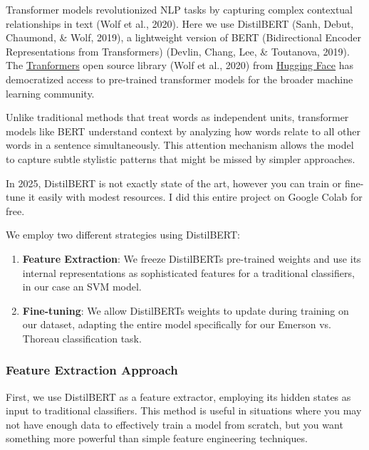 \documentclass[
]{article}
\begin{document}
Transformer models revolutionized NLP tasks by capturing complex
contextual relationships in text (Wolf et al., 2020). Here we use
DistilBERT (Sanh, Debut, Chaumond, \& Wolf, 2019), a lightweight version
of BERT (Bidirectional Encoder Representations from Transformers)
(Devlin, Chang, Lee, \& Toutanova, 2019). The
\href{https://github.com/huggingface/transformers}{Tranformers} open
source library (Wolf et al., 2020) from
\href{https://huggingface.co/}{Hugging Face} has democratized access to
pre-trained transformer models for the broader machine learning
community.

Unlike traditional methods that treat words as independent units,
transformer models like BERT understand context by analyzing how words
relate to all other words in a sentence simultaneously. This
\textquotesingle attention mechanism\textquotesingle{} allows the model
to capture subtle stylistic patterns that might be missed by simpler
approaches.

In 2025, DistilBERT is not exactly state of the art, however you can
train or fine-tune it easily with modest resources. I did this entire
project on Google Colab for free.

We employ two different strategies using DistilBERT:

\begin{enumerate}
\def\labelenumi{\arabic{enumi}.}
\item
  \textbf{Feature Extraction}: We freeze DistilBERT\textquotesingle s
  pre-trained weights and use its internal representations as
  sophisticated features for a traditional classifiers, in our case an
  SVM model.
\item
  \textbf{Fine-tuning}: We allow DistilBERT\textquotesingle s weights to
  update during training on our dataset, adapting the entire model
  specifically for our Emerson vs. Thoreau classification task.
\end{enumerate}

\subsubsection{Feature Extraction
Approach}\label{feature-extraction-approach}

First, we use DistilBERT as a feature extractor, employing its hidden
states as input to traditional classifiers. This method is useful in
situations where you may not have enough data to effectively train a
model from scratch, but you want something more powerful than simple
feature engineering techniques.
\end{document}
